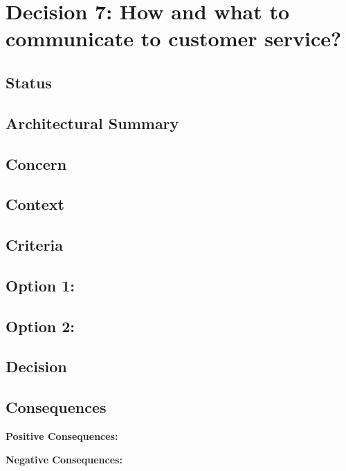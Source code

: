 \section*{Decision 7: How and what to communicate to customer service?}

\subsection*{Status}

\subsection*{Architectural Summary}


\subsection*{Concern}


\subsection*{Context}


\subsection*{Criteria}
\begin{itemize}
\end{itemize}

\subsection*{Option 1: }

\subsection*{Option 2: }

\subsection*{Decision}

\subsection*{Consequences}
\textbf{Positive Consequences:}
\begin{itemize}
\end{itemize}
\textbf{Negative Consequences:}
\begin{itemize}
\end{itemize}